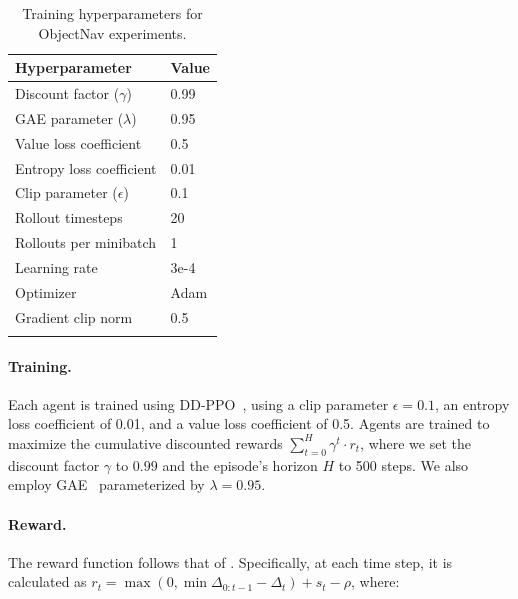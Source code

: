 \begin{table}[htbp]
    \centering
    \begin{tabular}{ l l }
        \toprule
        \textbf{Hyperparameter}\qquad\qquad\qquad & \textbf{Value}\\
        \midrule
        Discount factor ($\gamma$) & 0.99 \\
        GAE parameter ($\lambda$) & 0.95 \\
        Value loss coefficient & 0.5 \\
        Entropy loss coefficient & 0.01 \\
        Clip parameter ($\epsilon$) & 0.1 \\
        Rollout timesteps & 20\\
        Rollouts per minibatch & 1\\
        Learning rate & 3e-4\\
        Optimizer & Adam \cite{kingma2014adam} \\
        Gradient clip norm & 0.5 \\
        \toprule\\[-0.05in]
    \end{tabular}
    \caption{Training hyperparameters for ObjectNav experiments.}
    \label{tab:onhps}
\end{table}

\paragraph{Training.} Each agent is trained using DD-PPO~\cite{schulman2017proximal, wijmans2019dd}, using a clip parameter $\epsilon=0.1$, an entropy loss coefficient of 0.01, and a value loss coefficient of 0.5. Agents are trained to maximize the cumulative discounted rewards $\sum_{t=0}^H\gamma^t\cdot r_t$, where we set the discount factor $\gamma$ to $0.99$ and the episode's horizon $H$ to 500 steps. We also employ GAE~\cite{schulman2015high} parameterized by $\lambda=0.95$. 

\paragraph{Reward.} The reward function follows that of \cite{khandelwal2021simple}. Specifically, at each time step, it is calculated as $r_t = \max(0, \min\Delta_{0:t-1} - \Delta_{t}) + s_t - \rho$, where:

